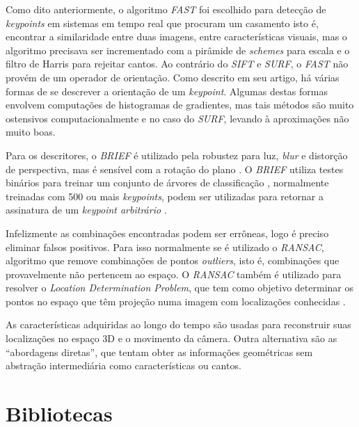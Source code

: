 Como dito anteriormente, o algoritmo \textit{FAST} foi escolhido para detecção de \textit{keypoints} em sistemas em tempo real que procuram um casamento isto é, encontrar a similaridade entre duas imagens, entre características visuais, mas o algoritmo precisava ser incrementado com a pirâmide de \textit{schemes} para escala\cite{ORB-Artigo} e o filtro de Harris\cite{ORB-Artigo} para rejeitar cantos. Ao contrário do \textit{SIFT} e \textit{SURF}, o \textit{FAST} não provém de um operador de orientação. Como descrito em seu artigo, há várias formas de se descrever a orientação de um \textit{keypoint}. Algumas destas formas envolvem computações de histogramas de gradientes, mas tais métodos são muito ostensivos computacionalmente e no caso do \textit{SURF}, levando à aproximações não muito boas.

Para os descritores, o \textit{BRIEF} é utilizado pela robustez para luz, \textit{blur} e distorção de perspectiva, mas é sensível com a rotação do plano \cite{ORB-Artigo}. O \textit{BRIEF} utiliza testes binários para treinar um conjunto de árvores de classificação \cite{ORB-Artigo}, normalmente treinadas com 500 ou mais \textit{keypoints}, podem ser utilizadas para retornar a assinatura de um \textit{keypoint arbitrário} \cite{ORB-Artigo}.

Infelizmente as combinações encontradas podem ser errôneas, logo é preciso eliminar falsos positivos. Para isso normalmente se é utilizado o \textit{RANSAC}, algoritmo que remove combinações de pontos \textit{outliers}, isto é, combinações que provavelmente não pertencem ao espaço. O \textit{RANSAC} também é utilizado para resolver o \textit{Location Determination Problem}, que tem como objetivo determinar os pontos no espaço que têm projeção numa imagem com localizações conhecidas \cite{RANSAC}.

As características adquiridas ao longo do tempo são usadas para reconstruir suas localizações no espaço 3D e o movimento da câmera. Outra alternativa são as “abordagens diretas”, que tentam obter as informações geométricas sem abstração intermediária como características ou cantos.
  
\section{Bibliotecas}
  
